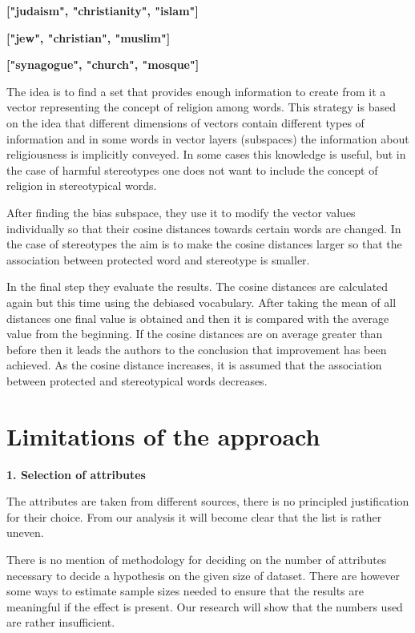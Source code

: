 \documentclass[
  12pt,
]{book}
\begin{document}
\begin{minipage}{1.0\textwidth}
\textbf{["judaism", "christianity", "islam"]}

\textbf{["jew", "christian", "muslim"]}


\textbf{["synagogue", "church", "mosque"]}
\end{minipage}

The idea is to find a set that provides enough information to create from it a vector representing the concept of religion among words. This strategy is based on the idea that different dimensions of vectors contain different types of information and in some words in vector layers (subspaces) the information about religiousness is implicitly conveyed. In some cases this knowledge is useful, but in the case of harmful stereotypes one does not want to include the concept of religion in stereotypical words.

After finding the bias subspace, they use it to modify the vector values individually so that their cosine distances towards certain words are changed. In the case of stereotypes the aim is to make the cosine distances larger so that the association between protected word and stereotype is smaller.

In the final step they evaluate the results. The cosine distances are calculated again but this time using the debiased vocabulary. After taking the mean of all distances one final value is obtained and then it is compared with the average value from the beginning. If the cosine distances are on average greater than before then it leads the authors to the conclusion that improvement has been achieved. As the cosine distance increases, it is assumed that the association between protected and stereotypical words decreases.

\hypertarget{limitations-of-the-approach}{%
\section{Limitations of the approach}\label{limitations-of-the-approach}}

\textbf{1. Selection of attributes}

The attributes are taken from different sources, there is no principled justification for their choice. From our analysis it will become clear that the list is rather uneven.

There is no mention of methodology for deciding on the number of attributes necessary to decide a hypothesis on the given size of dataset. There are however some ways to estimate sample sizes needed to ensure that the results are meaningful if the effect is present. Our research will show that the numbers used
are rather insufficient.
\end{document}
